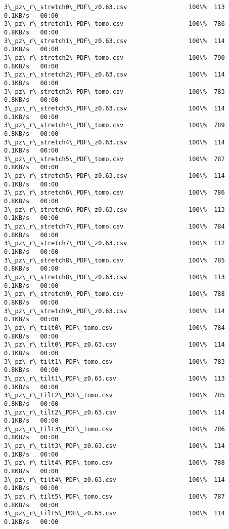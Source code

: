 \documentclass[11pt]{article}
\begin{document}
\begin{Verbatim}[commandchars=\\\{\}]
3\_pz\_r\_stretch0\_PDF\_z0.63.csv                 100\%  113     0.1KB/s   00:00    
3\_pz\_r\_stretch1\_PDF\_tomo.csv                  100\%  786     0.8KB/s   00:00    
3\_pz\_r\_stretch1\_PDF\_z0.63.csv                 100\%  114     0.1KB/s   00:00    
3\_pz\_r\_stretch2\_PDF\_tomo.csv                  100\%  790     0.8KB/s   00:00    
3\_pz\_r\_stretch2\_PDF\_z0.63.csv                 100\%  114     0.1KB/s   00:00    
3\_pz\_r\_stretch3\_PDF\_tomo.csv                  100\%  783     0.8KB/s   00:00    
3\_pz\_r\_stretch3\_PDF\_z0.63.csv                 100\%  114     0.1KB/s   00:00    
3\_pz\_r\_stretch4\_PDF\_tomo.csv                  100\%  789     0.8KB/s   00:00    
3\_pz\_r\_stretch4\_PDF\_z0.63.csv                 100\%  114     0.1KB/s   00:00    
3\_pz\_r\_stretch5\_PDF\_tomo.csv                  100\%  787     0.8KB/s   00:00    
3\_pz\_r\_stretch5\_PDF\_z0.63.csv                 100\%  114     0.1KB/s   00:00    
3\_pz\_r\_stretch6\_PDF\_tomo.csv                  100\%  786     0.8KB/s   00:00    
3\_pz\_r\_stretch6\_PDF\_z0.63.csv                 100\%  113     0.1KB/s   00:00    
3\_pz\_r\_stretch7\_PDF\_tomo.csv                  100\%  784     0.8KB/s   00:00    
3\_pz\_r\_stretch7\_PDF\_z0.63.csv                 100\%  112     0.1KB/s   00:00    
3\_pz\_r\_stretch8\_PDF\_tomo.csv                  100\%  785     0.8KB/s   00:00    
3\_pz\_r\_stretch8\_PDF\_z0.63.csv                 100\%  113     0.1KB/s   00:00    
3\_pz\_r\_stretch9\_PDF\_tomo.csv                  100\%  788     0.8KB/s   00:00    
3\_pz\_r\_stretch9\_PDF\_z0.63.csv                 100\%  114     0.1KB/s   00:00    
3\_pz\_r\_tilt0\_PDF\_tomo.csv                     100\%  784     0.8KB/s   00:00    
3\_pz\_r\_tilt0\_PDF\_z0.63.csv                    100\%  114     0.1KB/s   00:00    
3\_pz\_r\_tilt1\_PDF\_tomo.csv                     100\%  783     0.8KB/s   00:00    
3\_pz\_r\_tilt1\_PDF\_z0.63.csv                    100\%  113     0.1KB/s   00:00    
3\_pz\_r\_tilt2\_PDF\_tomo.csv                     100\%  785     0.8KB/s   00:00    
3\_pz\_r\_tilt2\_PDF\_z0.63.csv                    100\%  114     0.1KB/s   00:00    
3\_pz\_r\_tilt3\_PDF\_tomo.csv                     100\%  786     0.8KB/s   00:00    
3\_pz\_r\_tilt3\_PDF\_z0.63.csv                    100\%  114     0.1KB/s   00:00    
3\_pz\_r\_tilt4\_PDF\_tomo.csv                     100\%  788     0.8KB/s   00:00    
3\_pz\_r\_tilt4\_PDF\_z0.63.csv                    100\%  114     0.1KB/s   00:00    
3\_pz\_r\_tilt5\_PDF\_tomo.csv                     100\%  787     0.8KB/s   00:00    
3\_pz\_r\_tilt5\_PDF\_z0.63.csv                    100\%  114     0.1KB/s   00:00    

\end{Verbatim}
\end{document}
